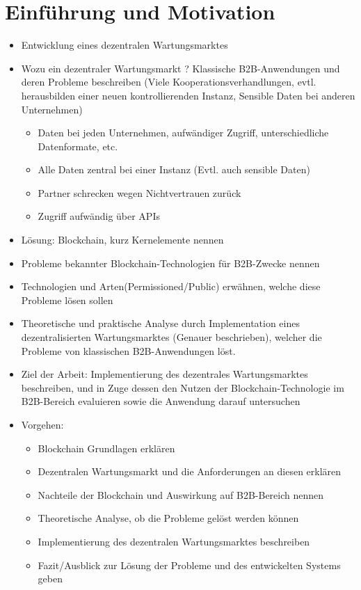 \chapter{Einführung und Motivation}
\label{cha:einfuehrung}

\begin{itemize}
    \item Entwicklung eines dezentralen Wartungsmarktes
    \item Wozu ein dezentraler Wartungsmarkt ? Klassische B2B-Anwendungen und deren Probleme beschreiben (Viele Kooperationsverhandlungen, evtl. herausbilden einer neuen kontrollierenden Instanz, Sensible Daten bei anderen Unternehmen) 
  
     \begin{itemize}
      \item Daten bei jeden Unternehmen, aufwändiger Zugriff, unterschiedliche Datenformate, etc.
      \item Alle Daten zentral bei einer Instanz (Evtl. auch sensible Daten)
      \item Partner schrecken wegen Nichtvertrauen zurück
      \item Zugriff aufwändig über APIs
    \end{itemize}
    \item Lösung: Blockchain, kurz Kernelemente nennen
    \item Probleme bekannter Blockchain-Technologien für B2B-Zwecke nennen
    \item Technologien und Arten(Permissioned/Public) erwähnen, welche diese Probleme lösen sollen
    \item Theoretische und praktische Analyse durch Implementation eines dezentralisierten Wartungsmarktes (Genauer beschrieben), welcher die Probleme von klassischen B2B-Anwendungen löst.
    \item Ziel der Arbeit: Implementierung des dezentrales Wartungsmarktes beschreiben, und in Zuge dessen den Nutzen der Blockchain-Technologie im B2B-Bereich evaluieren sowie die Anwendung darauf untersuchen
    \item Vorgehen:
    \begin{itemize}
      \item Blockchain Grundlagen erklären
      \item Dezentralen Wartungsmarkt und die Anforderungen an diesen erklären
      \item Nachteile der Blockchain und Auswirkung auf B2B-Bereich nennen 
      \item Theoretische Analyse, ob die Probleme gelöst werden können
      \item Implementierung des dezentralen Wartungsmarktes beschreiben
      \item Fazit/Ausblick zur Lösung der Probleme und des entwickelten Systems geben
    \end{itemize}
  \end{itemize}

  \cite{WustyouneedBlockchain2017}
